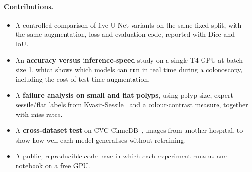\paragraph{Contributions.}
\begin{itemize}
  \item A controlled comparison of five U-Net variants on the same fixed split, with the same augmentation,
        loss and evaluation code, reported with Dice and IoU.
  \item An \textbf{accuracy versus inference-speed} study on a single T4 GPU at batch size 1, which shows which models
        can run in real time during a colonoscopy, including the cost of test-time augmentation.
  \item A \textbf{failure analysis on small and flat polyps}, using polyp size, expert sessile/flat labels from
        Kvasir-Sessile~\cite{jha2021sessile} and a colour-contrast measure, together with miss rates.
  \item A \textbf{cross-dataset test} on CVC-ClinicDB~\cite{bernal2015cvc}, images from another hospital, to show how
        well each model generalises without retraining.
  \item A public, reproducible code base in which each experiment runs as one notebook on a free GPU.
\end{itemize}
